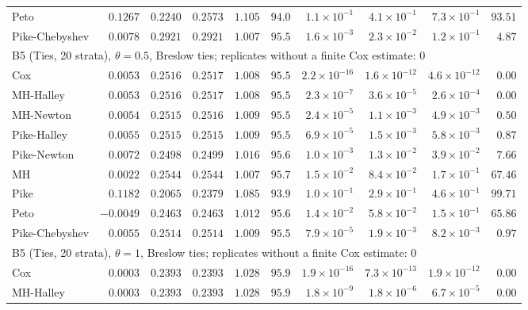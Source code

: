 \begin{landscape}
\begin{longtable}{lrrrrrrrrr}
Peto & $0.1267$ & $0.2240$ & $0.2573$ & $1.105$ & $94.0$ & $1.1 \times 10^{-1}$ & $4.1 \times 10^{-1}$ & $7.3 \times 10^{-1}$ & $93.51$ \\
Pike-Chebyshev & $0.0078$ & $0.2921$ & $0.2921$ & $1.007$ & $95.5$ & $1.6 \times 10^{-3}$ & $2.3 \times 10^{-2}$ & $1.2 \times 10^{-1}$ & $4.87$ \\
\multicolumn{10}{l}{B5 (Ties, 20 strata), $\theta = 0.5$, Breslow ties; replicates without a finite Cox estimate: 0} \\
Cox & $0.0053$ & $0.2516$ & $0.2517$ & $1.008$ & $95.5$ & $2.2 \times 10^{-16}$ & $1.6 \times 10^{-12}$ & $4.6 \times 10^{-12}$ & $0.00$ \\
MH-Halley & $0.0053$ & $0.2516$ & $0.2517$ & $1.008$ & $95.5$ & $2.3 \times 10^{-7}$ & $3.6 \times 10^{-5}$ & $2.6 \times 10^{-4}$ & $0.00$ \\
MH-Newton & $0.0054$ & $0.2515$ & $0.2516$ & $1.009$ & $95.5$ & $2.4 \times 10^{-5}$ & $1.1 \times 10^{-3}$ & $4.9 \times 10^{-3}$ & $0.50$ \\
Pike-Halley & $0.0055$ & $0.2515$ & $0.2515$ & $1.009$ & $95.5$ & $6.9 \times 10^{-5}$ & $1.5 \times 10^{-3}$ & $5.8 \times 10^{-3}$ & $0.87$ \\
Pike-Newton & $0.0072$ & $0.2498$ & $0.2499$ & $1.016$ & $95.6$ & $1.0 \times 10^{-3}$ & $1.3 \times 10^{-2}$ & $3.9 \times 10^{-2}$ & $7.66$ \\
MH & $0.0022$ & $0.2544$ & $0.2544$ & $1.007$ & $95.7$ & $1.5 \times 10^{-2}$ & $8.4 \times 10^{-2}$ & $1.7 \times 10^{-1}$ & $67.46$ \\
Pike & $0.1182$ & $0.2065$ & $0.2379$ & $1.085$ & $93.9$ & $1.0 \times 10^{-1}$ & $2.9 \times 10^{-1}$ & $4.6 \times 10^{-1}$ & $99.71$ \\
Peto & $-0.0049$ & $0.2463$ & $0.2463$ & $1.012$ & $95.6$ & $1.4 \times 10^{-2}$ & $5.8 \times 10^{-2}$ & $1.5 \times 10^{-1}$ & $65.86$ \\
Pike-Chebyshev & $0.0055$ & $0.2514$ & $0.2514$ & $1.009$ & $95.5$ & $7.9 \times 10^{-5}$ & $1.9 \times 10^{-3}$ & $8.2 \times 10^{-3}$ & $0.97$ \\
\multicolumn{10}{l}{B5 (Ties, 20 strata), $\theta = 1$, Breslow ties; replicates without a finite Cox estimate: 0} \\
Cox & $0.0003$ & $0.2393$ & $0.2393$ & $1.028$ & $95.9$ & $1.9 \times 10^{-16}$ & $7.3 \times 10^{-13}$ & $1.9 \times 10^{-12}$ & $0.00$ \\
MH-Halley & $0.0003$ & $0.2393$ & $0.2393$ & $1.028$ & $95.9$ & $1.8 \times 10^{-9}$ & $1.8 \times 10^{-6}$ & $6.7 \times 10^{-5}$ & $0.00$ \\

\end{longtable}
\end{landscape}
